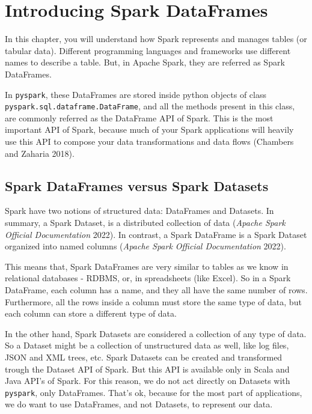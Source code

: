 \documentclass[
  11pt,
  letterpaper,
  DIV=11,
  numbers=noendperiod]{scrreprt}
\begin{document}

\hypertarget{sec-dataframes-chapter}{%
\chapter{Introducing Spark DataFrames}\label{sec-dataframes-chapter}}

In this chapter, you will understand how Spark represents and manages
tables (or tabular data). Different programming languages and frameworks
use different names to describe a table. But, in Apache Spark, they are
referred as Spark DataFrames.

In \texttt{pyspark}, these DataFrames are stored inside python objects
of class \texttt{pyspark.sql.dataframe.DataFrame}, and all the methods
present in this class, are commonly referred as the DataFrame API of
Spark. This is the most important API of Spark, because much of your
Spark applications will heavily use this API to compose your data
transformations and data flows (Chambers and Zaharia 2018).

\hypertarget{spark-dataframes-versus-spark-datasets}{%
\section{Spark DataFrames versus Spark
Datasets}\label{spark-dataframes-versus-spark-datasets}}

Spark have two notions of structured data: DataFrames and Datasets. In
summary, a Spark Dataset, is a distributed collection of data
(\emph{Apache Spark Official Documentation} 2022). In contrast, a Spark
DataFrame is a Spark Dataset organized into named columns (\emph{Apache
Spark Official Documentation} 2022).

This means that, Spark DataFrames are very similar to tables as we know
in relational databases - RDBMS, or, in spreadsheets (like Excel). So in
a Spark DataFrame, each column has a name, and they all have the same
number of rows. Furthermore, all the rows inside a column must store the
same type of data, but each column can store a different type of data.

In the other hand, Spark Datasets are considered a collection of any
type of data. So a Dataset might be a collection of unstructured data as
well, like log files, JSON and XML trees, etc. Spark Datasets can be
created and transformed trough the Dataset API of Spark. But this API is
available only in Scala and Java API's of Spark. For this reason, we do
not act directly on Datasets with \texttt{pyspark}, only DataFrames.
That's ok, because for the most part of applications, we do want to use
DataFrames, and not Datasets, to represent our data.
\end{document}
